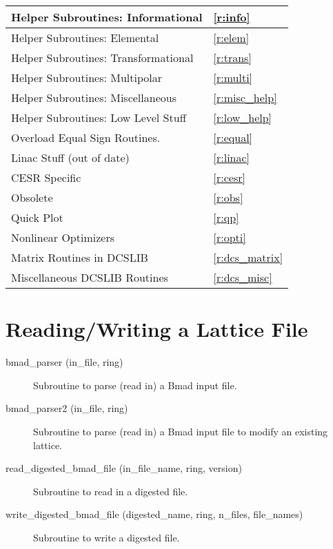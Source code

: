 \begin{center}
\begin{tabular}{|l|l|}
 	Helper Subroutines: Informational       & \ref{r:info}       \\ \hline
 	Helper Subroutines: Elemental           & \ref{r:elem}       \\ \hline
 	Helper Subroutines: Transformational    & \ref{r:trans}      \\ \hline
 	Helper Subroutines: Multipolar          & \ref{r:multi}      \\ \hline
 	Helper Subroutines: Miscellaneous       & \ref{r:misc_help}  \\ \hline
 	Helper Subroutines: Low Level Stuff     & \ref{r:low_help}   \\ \hline
 	Overload Equal Sign Routines.           & \ref{r:equal}      \\ \hline
 	Linac Stuff (out of date)               & \ref{r:linac}      \\ \hline
 	CESR Specific                           & \ref{r:cesr}       \\ \hline
 	Obsolete                                & \ref{r:obs}        \\ \hline \hline
  Quick Plot                              & \ref{r:qp}         \\ \hline
  Nonlinear Optimizers                    & \ref{r:opti}       \\ \hline
  Matrix Routines in DCSLIB               & \ref{r:dcs_matrix} \\ \hline
  Miscellaneous DCSLIB Routines           & \ref{r:dcs_misc}   \\ \hline
\end{tabular}
\end{center}
\toffset

\section{Reading/Writing a Lattice File} 
\label{r:read}

\begin{description}

\item[bmad\_parser (in\_file, ring)] \Newline
Subroutine to parse (read in) a Bmad input file. 

\item[bmad\_parser2 (in\_file, ring)] \Newline
Subroutine to parse (read in) a Bmad input file to modify an existing lattice. 

\item[read\_digested\_bmad\_file (in\_file\_name, ring, version)] \Newline
Subroutine to read in a digested file. 

\item[write\_digested\_bmad\_file (digested\_name, ring, n\_files, file\_names)] \Newline
Subroutine to write a digested file. 

\end{description}

